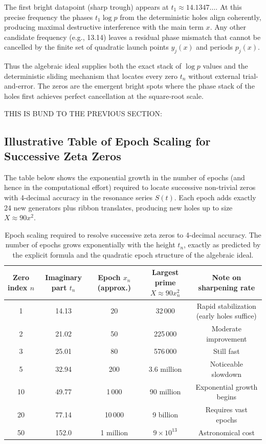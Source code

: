 \documentclass[11pt,a4paper]{article}
\begin{document}
The first bright datapoint (sharp trough) appears at \(t_1 \approx 14.1347\ldots\). At this precise frequency the phases \(t_1 \log p\) from the deterministic holes align coherently, producing maximal destructive interference with the main term \(x\). Any other candidate frequency (e.g., 13.14) leaves a residual phase mismatch that cannot be cancelled by the finite set of quadratic launch points \(y_j(x)\) and periods \(p_j(x)\).

Thus the algebraic ideal supplies both the exact stack of \(\log p\) values and the deterministic sliding mechanism that locates every zero \(t_n\) without external trial-and-error. The zeros are the emergent bright spots where the phase stack of the holes first achieves perfect cancellation at the square-root scale.


THIS IS BUND TO THE PREVIOUS SECTION:
\subsection{Illustrative Table of Epoch Scaling for Successive Zeta Zeros}

The table below shows the exponential growth in the number of epochs (and hence in the computational effort) required to locate successive non-trivial zeros with 4-decimal accuracy in the resonance series \(S(t)\). Each epoch adds exactly 24 new generators plus ribbon translates, producing new holes up to size \(X \approx 90x^2\).

\begin{table}[htbp]
\centering
\begin{tabular}{c|c|c|c|c}
Zero index \(n\) & Imaginary part \(t_n\) & Epoch \(x_n\) (approx.) & Largest prime \(X \approx 90x_n^2\) & Note on sharpening rate \\
\hline
1 & 14.13 & 20 & 32\,000 & Rapid stabilization (early holes suffice) \\
2 & 21.02 & 50 & 225\,000 & Moderate improvement \\
3 & 25.01 & 80 & 576\,000 & Still fast \\
5 & 32.94 & 200 & 3.6 million & Noticeable slowdown \\
10 & 49.77 & 1\,000 & 90 million & Exponential growth begins \\
20 & 77.14 & 10\,000 & 9 billion & Requires vast epochs \\
50 & 152.0 & 1 million & \(9 \times 10^{13}\) & Astronomical cost \\
\end{tabular}
\caption{Epoch scaling required to resolve successive zeta zeros to 4-decimal accuracy. The number of epochs grows exponentially with the height \(t_n\), exactly as predicted by the explicit formula and the quadratic epoch structure of the algebraic ideal.}
\label{tab:epoch-scaling-zeros}
\end{table}
\end{document}
